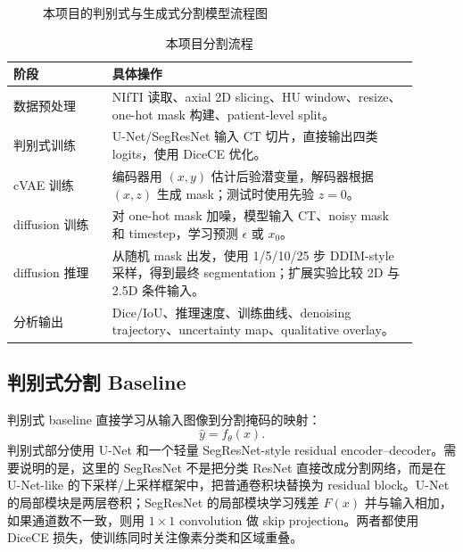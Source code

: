 \documentclass[lang=cn,11pt,a4paper]{elegantpaper}
\begin{document}
\begin{figure}[H]
{
}
\caption{本项目的判别式与生成式分割模型流程图}
\label{fig:pipeline_architecture}
\end{figure}

\begin{table}[H]
\centering
\caption{本项目分割流程}
\label{tab:pipeline}
\begin{tabular}{p{0.22\linewidth}p{0.68\linewidth}}
\toprule
阶段 & 具体操作 \\
\midrule
数据预处理 & NIfTI 读取、axial 2D slicing、HU window、resize、one-hot mask 构建、patient-level split。 \\
判别式训练 & U-Net/SegResNet 输入 CT 切片，直接输出四类 logits，使用 DiceCE 优化。 \\
cVAE 训练 & 编码器用 $(x,y)$ 估计后验潜变量，解码器根据 $(x,z)$ 生成 mask；测试时使用先验 $z=0$。 \\
diffusion 训练 & 对 one-hot mask 加噪，模型输入 CT、noisy mask 和 timestep，学习预测 $\epsilon$ 或 $x_0$。 \\
diffusion 推理 & 从随机 mask 出发，使用 1/5/10/25 步 DDIM-style 采样，得到最终 segmentation；扩展实验比较 2D 与 2.5D 条件输入。 \\
分析输出 & Dice/IoU、推理速度、训练曲线、denoising trajectory、uncertainty map、qualitative overlay。 \\
\bottomrule
\end{tabular}
\end{table}

\subsection{判别式分割 Baseline}

判别式 baseline 直接学习从输入图像到分割掩码的映射：
\[
\hat{y}=f_\theta(x).
\]
判别式部分使用 U-Net 和一个轻量 SegResNet-style residual encoder--decoder。需要说明的是，这里的 SegResNet 不是把分类 ResNet 直接改成分割网络，而是在 U-Net-like 的下采样/上采样框架中，把普通卷积块替换为 residual block。U-Net 的局部模块是两层卷积；SegResNet 的局部模块学习残差 $F(x)$ 并与输入相加，如果通道数不一致，则用 $1\times1$ convolution 做 skip projection。两者都使用 DiceCE 损失，使训练同时关注像素分类和区域重叠。
\end{document}
